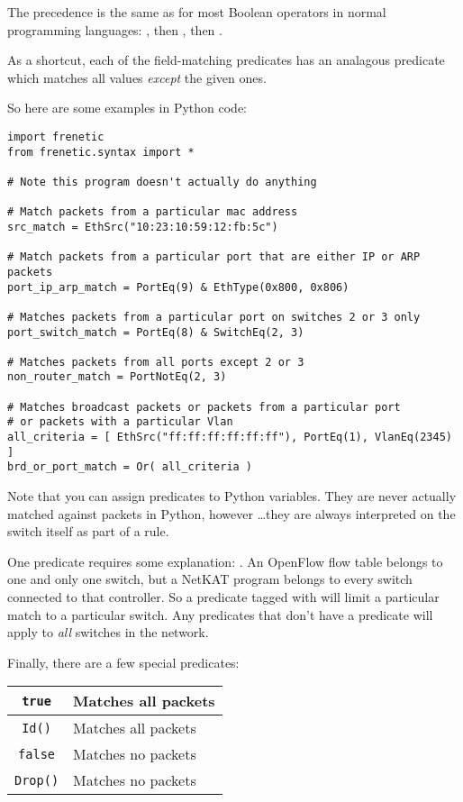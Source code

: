 \bigskip

The precedence is the same as for most Boolean operators in normal programming languages: 
, then , then .  

As a shortcut, each of the field-matching predicates  has an analagous 
predicate which matches all values \emph{except} the given ones.  

So here are some examples in Python code:

\begin{verbatim}
import frenetic
from frenetic.syntax import *

# Note this program doesn't actually do anything

# Match packets from a particular mac address
src_match = EthSrc("10:23:10:59:12:fb:5c")

# Match packets from a particular port that are either IP or ARP packets
port_ip_arp_match = PortEq(9) & EthType(0x800, 0x806)

# Matches packets from a particular port on switches 2 or 3 only
port_switch_match = PortEq(8) & SwitchEq(2, 3)

# Matches packets from all ports except 2 or 3
non_router_match = PortNotEq(2, 3)

# Matches broadcast packets or packets from a particular port 
# or packets with a particular Vlan
all_criteria = [ EthSrc("ff:ff:ff:ff:ff:ff"), PortEq(1), VlanEq(2345) ] 
brd_or_port_match = Or( all_criteria ) 

\end{verbatim}

Note that you can assign predicates to Python variables.  They are never actually matched against packets
in Python, however \ldots they are always interpreted on the switch itself as part of a rule.

One predicate requires some explanation: .  
An OpenFlow flow table belongs to one and only one switch, but a NetKAT program belongs to every
switch connected to that controller.  
So a predicate tagged with  will limit a particular match to a particular switch.
Any predicates that don't have a  predicate will apply to \textit{all} switches in the network.

Finally, there are a few special predicates:

\bigskip
\begin{tabularx}{\linewidth}{|c|X|}
\hline\hline
\texttt{true} & Matches all packets
\\ \hline  
\texttt{Id()} & Matches all packets
\\ \hline  
\texttt{false} & Matches no packets
\\ \hline  
\texttt{Drop()} & Matches no packets
\\ \hline\hline
\end{tabularx}
\bigskip

